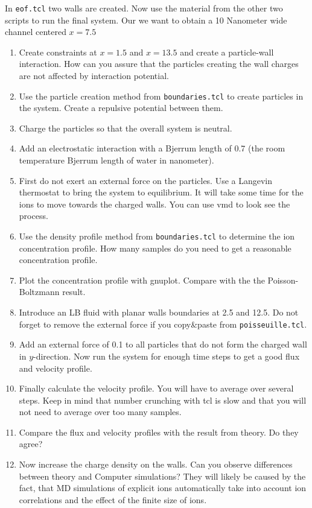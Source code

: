 In \lstinline|eof.tcl| two walls are created. Now use the material
from the other two scripts to run the final system.
Our we want to obtain a 10 Nanometer wide channel centered
$x=7.5$
\begin{enumerate}
  \item Create constraints at $x=1.5$ and $x=13.5$ and create 
    a particle-wall interaction. How can you assure that the 
    particles creating the wall charges are not affected by 
    interaction potential.
  \item
Use the particle
creation method from \lstinline|boundaries.tcl| to
create particles in the system. Create a repulsive potential between them.
  \item
Charge the particles so that
the overall system is neutral. 
  \item Add an electrostatic interaction with a Bjerrum length 
    of 0.7 (the room temperature Bjerrum length of water in nanometer).
  \item First do not exert an external force on the particles.
       Use a Langevin thermostat to bring the system to equilibrium.
       It will take some time for the ions to move towards the charged
       walls. You can use vmd to look see the process.
  \item
       Use the density profile method from \lstinline|boundaries.tcl|
       to determine the ion concentration profile. How many samples
       do you need to get a reasonable concentration profile.
   \item
     Plot the concentration profile with gnuplot. Compare with the
     the Poisson-Boltzmann result. 
   \item 
     Introduce an LB fluid with planar walls boundaries at 2.5 and 12.5. 
     Do not forget to remove the
     external force if you copy\&paste from \lstinline|poisseuille.tcl|.
   \item 
     Add an external force of 0.1 to all particles that do not form the
     charged wall in $y$-direction. Now run the system for enough time
     steps to get a good flux and velocity profile.
   \item 
     Finally calculate the velocity profile. You will have to 
     average over several steps. Keep in mind that number crunching
     with tcl is slow and that you will not need to average over too 
     many samples.
   \item 
     Compare the flux and velocity profiles with the result from
     theory. Do they agree?
   \item
     Now increase the charge density on the walls. Can you observe differences
     between theory and Computer simulations? They will likely be caused
     by the fact, that MD simulations of explicit ions automatically
     take into account ion correlations and the effect of the finite size
     of ions.
\end{enumerate}















